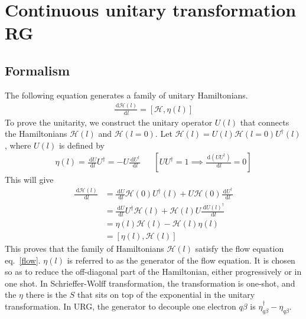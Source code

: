 \section{Continuous unitary transformation RG}
\subsection{Formalism}
The following equation generates a family of unitary Hamiltonians.
\begin{equation}\begin{aligned}
	\label{flow}
	\frac{\:\mathrm{d}\mathcal{H}(l)}{\:\mathrm{d}l} = \left[\mathcal{H},\eta(l)\right]
\end{aligned}\end{equation}
To prove the unitarity\cite{kehrein}, we construct the unitary operator \(U(l)\) that connects the Hamiltonians \(\mathcal{H}(l)\) and \(\mathcal{H}(l=0)\). Let \(\mathcal{H}(l) = U(l)\mathcal{H}(l=0)U^\dagger(l)\), where \(U(l)\) is defined by
\begin{equation}\begin{aligned}
	\eta(l) = \frac{\:\mathrm{d}U}{\:\mathrm{d}l}U^\dagger = -U\frac{\:\mathrm{d}U^\dagger}{\:\mathrm{d}l} &&\left[UU^\dagger = 1 \implies \frac{\:\mathrm{d}\left(U U^\dagger\right)}{\:\mathrm{d}l}=0\right]
\end{aligned}\end{equation}
This will give
\begin{equation}\begin{aligned}
	\frac{\:\mathrm{d}\mathcal{H}(l)}{\:\mathrm{d}l} &= \frac{\:\mathrm{d}U}{\:\mathrm{d}l}\mathcal{H}(0)U^\dagger(l) + U\mathcal{H}(0)\frac{\:\mathrm{d}U^\dagger}{\:\mathrm{d}l}\\
							 &= \frac{\:\mathrm{d}U}{\:\mathrm{d}l}U^\dagger\mathcal{H}(l) + \mathcal{H}(l)U\frac{\:\mathrm{d}U(l)^\dagger}{\:\mathrm{d}l}\\
        &= \eta(l)\mathcal{H}(l) - \mathcal{H}(l)\eta(l)\\
	&=\left[\eta(l),\mathcal{H}(l)\right]
\end{aligned}\end{equation}
This proves that the family of Hamiltonians \(\mathcal{H}(l)\) satisfy the flow equation eq.~\ref{flow}. \(\eta(l)\) is referred to as the generator of the flow equation. It is chosen so as to reduce the off-diagonal part of the Hamiltonian, either progressively or in one shot. In Schrieffer-Wolff transformation, the transformation is one-shot, and the \(\eta\) there is the \(S\) that sits on top of the exponential in the unitary transformation. In URG, the generator to decouple one electron \(q\beta\) is \(\eta^\dagger_{q\beta} - \eta_{q\beta}\).

